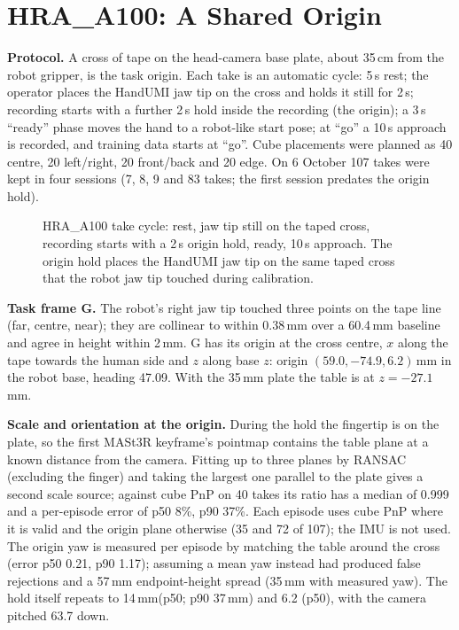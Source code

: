 \documentclass[conference,10pt]{IEEEtran}
\newcommand{\mm}{\,mm\xspace}
\begin{document}
\section{HRA\_A100: A Shared Origin}\label{p2:sec:a100}
\textbf{Protocol.} A cross of tape on the head-camera base plate, about 35\,cm from the robot gripper, is the task origin.
Each take is an automatic cycle: 5\,s rest; the operator places the HandUMI jaw tip on the cross and holds it still for
2\,s; recording starts with a further 2\,s hold inside the recording (the origin); a 3\,s ``ready'' phase moves the hand to a
robot-like start pose; at ``go'' a 10\,s approach is recorded, and training data starts at ``go''. Cube placements were planned
as 40 centre, 20 left/right, 20 front/back and 20 edge. On 6 October 107 takes were kept in four sessions (7, 8, 9 and 83
takes; the first session predates the origin hold).

\begin{figure}[t]
\centering
{}
\caption{HRA\_A100 take cycle: rest, jaw tip still on the taped cross, recording starts with a 2\,s origin hold, ready, 10\,s approach. The origin hold places the HandUMI jaw tip on the same taped cross that the robot jaw tip touched
during calibration.}
\label{p2:fig:protocol}
\end{figure}

\textbf{Task frame G.} The robot's right jaw tip touched three points on the tape line (far, centre, near); they are collinear
to within 0.38\mm over a 60.4\mm baseline and agree in height within 2\mm. G has its origin at the cross centre, $x$ along the
tape towards the human side and $z$ along base $z$: origin $(59.0, -74.9, 6.2)$\mm in the robot base, heading
47.09\textdegree. With the 35\mm plate the table is at $z=-27.1$\mm.

\textbf{Scale and orientation at the origin.} During the hold the fingertip is on the plate, so the first MASt3R keyframe's
pointmap contains the table plane at a known distance from the camera. Fitting up to three planes by RANSAC (excluding the
finger) and taking the largest one parallel to the plate gives a second scale source; against cube PnP on 40 takes its ratio
has a median of 0.999 and a per-episode error of p50 8\%, p90 37\%. Each episode uses cube PnP where it is valid and the
origin plane otherwise (35 and 72 of 107); the IMU is not used. The origin yaw is measured per episode by matching the table
around the cross (error p50 0.21\textdegree, p90 1.17\textdegree); assuming a mean yaw instead had produced false rejections
and a 57\mm endpoint-height spread (35\mm with measured yaw). The hold itself repeats to 14\mm (p50; p90 37\mm) and
6.2\textdegree{} (p50), with the camera pitched 63.7\textdegree{} down.
\end{document}
